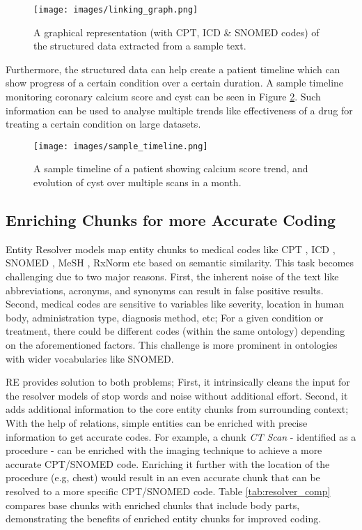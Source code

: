 \documentclass[letterpaper]{article}
\begin{document}
\begin{figure}[h!]
  \texttt{[image: images/linking\_graph.png]}
  \caption{A graphical representation (with CPT, ICD \& SNOMED codes) of the structured data extracted from a sample text.}
  \label{fig:re_graph}
\end{figure}

Furthermore, the structured data can help create a patient timeline which can show progress of a certain condition over a certain duration. A sample timeline monitoring coronary calcium score and cyst can be seen in Figure \ref{fig:pat_timleine}. Such information can be used to analyse multiple trends like effectiveness of a drug for treating a certain condition on large datasets.
 
\begin{figure}[h!]
  \texttt{[image: images/sample\_timeline.png]}
  \caption{A sample timeline of a patient showing calcium score trend, and evolution of cyst over multiple scans in a month.}
  \label{fig:pat_timleine}
\end{figure}

\subsection{Enriching Chunks for more Accurate Coding}

Entity Resolver models map entity chunks to medical codes like CPT \cite{cpt}, ICD \cite{icd}, SNOMED \cite{snomed}, MeSH \cite{mesh}, RxNorm \cite{rxnorm} etc based on semantic similarity. This task becomes challenging due to two major reasons. First, the inherent noise of the text like abbreviations, acronyms, and synonyms can result in false positive results. Second, medical codes are sensitive to variables like severity, location in human body, administration type, diagnosis method, etc; For a given condition or treatment, there could be different codes (within the same ontology) depending on the aforementioned factors. This challenge is more prominent in ontologies with wider vocabularies like SNOMED.

RE provides solution to both problems; First, it intrinsically cleans the input for the resolver models of stop words and noise without additional effort. Second, it adds additional information to the core entity chunks from surrounding context; With the help of relations, simple entities can be enriched with precise information to get accurate codes. For example, a chunk \textit{CT Scan} - identified as a procedure - can be enriched with the imaging technique to achieve a more accurate CPT/SNOMED code. Enriching it further with the location of the procedure (e.g, chest) would result in an even accurate chunk that can be resolved to a more specific CPT/SNOMED code. Table \ref{tab:resolver_comp} compares base chunks with enriched chunks that include body parts, demonstrating the benefits of enriched entity chunks for improved coding.
\end{document}
